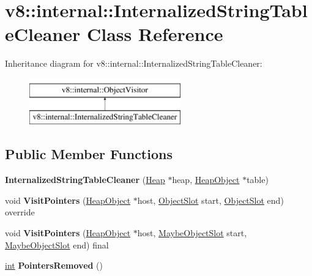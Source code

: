 \hypertarget{classv8_1_1internal_1_1InternalizedStringTableCleaner}{}\section{v8\+:\+:internal\+:\+:Internalized\+String\+Table\+Cleaner Class Reference}
\label{classv8_1_1internal_1_1InternalizedStringTableCleaner}
Inheritance diagram for v8\+:\+:internal\+:\+:Internalized\+String\+Table\+Cleaner\+:\begin{figure}[H]
\begin{center}
\leavevmode
\includegraphics[height=2.000000cm]{classv8_1_1internal_1_1InternalizedStringTableCleaner}
\end{center}
\end{figure}
\subsection*{Public Member Functions}
\begin{DoxyCompactItemize}
\item 
\mbox{\label{classv8_1_1internal_1_1InternalizedStringTableCleaner_accc8594c10ec0bdbeda77276e1f73d48}} 
{\bfseries Internalized\+String\+Table\+Cleaner} (\mbox{\hyperlink{classv8_1_1internal_1_1Heap}{Heap}} $\ast$heap, \mbox{\hyperlink{classv8_1_1internal_1_1HeapObject}{Heap\+Object}} $\ast$table)
\item 
\mbox{\label{classv8_1_1internal_1_1InternalizedStringTableCleaner_acca2006e6031ad5bc5b102bee5227dd0}} 
void {\bfseries Visit\+Pointers} (\mbox{\hyperlink{classv8_1_1internal_1_1HeapObject}{Heap\+Object}} $\ast$host, \mbox{\hyperlink{classv8_1_1internal_1_1ObjectSlot}{Object\+Slot}} start, \mbox{\hyperlink{classv8_1_1internal_1_1ObjectSlot}{Object\+Slot}} end) override
\item 
\mbox{\label{classv8_1_1internal_1_1InternalizedStringTableCleaner_ab424fcb7223e4929a17d9e9fc39df45f}} 
void {\bfseries Visit\+Pointers} (\mbox{\hyperlink{classv8_1_1internal_1_1HeapObject}{Heap\+Object}} $\ast$host, \mbox{\hyperlink{classv8_1_1internal_1_1MaybeObjectSlot}{Maybe\+Object\+Slot}} start, \mbox{\hyperlink{classv8_1_1internal_1_1MaybeObjectSlot}{Maybe\+Object\+Slot}} end) final
\item 
\mbox{\label{classv8_1_1internal_1_1InternalizedStringTableCleaner_a6ca655abce9550de8a5543fb7feaaa4c}} 
\mbox{\hyperlink{classint}{int}} {\bfseries Pointers\+Removed} ()
\end{DoxyCompactItemize}


